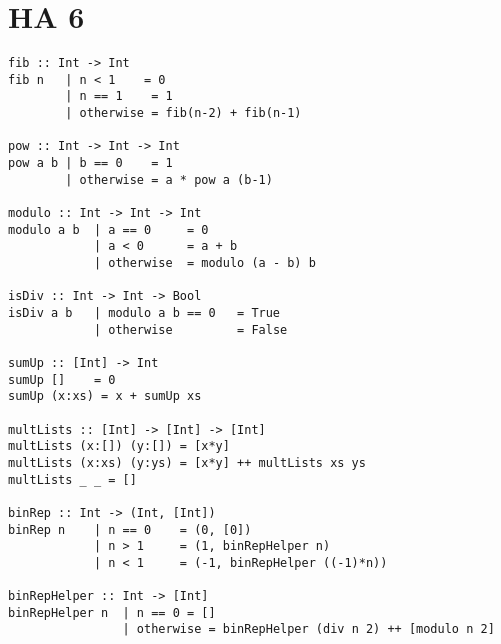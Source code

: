 \documentclass[a4paper]{article}
\begin{document}
\pagebreak

\section*{HA 6}

\begin{lstlisting}
fib :: Int -> Int
fib n   | n < 1    = 0
        | n == 1    = 1
        | otherwise = fib(n-2) + fib(n-1)    

pow :: Int -> Int -> Int
pow a b | b == 0    = 1
        | otherwise = a * pow a (b-1)

modulo :: Int -> Int -> Int
modulo a b  | a == 0     = 0
            | a < 0      = a + b
            | otherwise  = modulo (a - b) b

isDiv :: Int -> Int -> Bool
isDiv a b   | modulo a b == 0   = True
            | otherwise         = False

sumUp :: [Int] -> Int
sumUp []    = 0
sumUp (x:xs) = x + sumUp xs

multLists :: [Int] -> [Int] -> [Int]
multLists (x:[]) (y:[]) = [x*y]
multLists (x:xs) (y:ys) = [x*y] ++ multLists xs ys
multLists _ _ = []

binRep :: Int -> (Int, [Int])
binRep n    | n == 0    = (0, [0])
            | n > 1     = (1, binRepHelper n)
            | n < 1     = (-1, binRepHelper ((-1)*n))

binRepHelper :: Int -> [Int]
binRepHelper n  | n == 0 = []
                | otherwise = binRepHelper (div n 2) ++ [modulo n 2]
\end{lstlisting}
\end{document}

